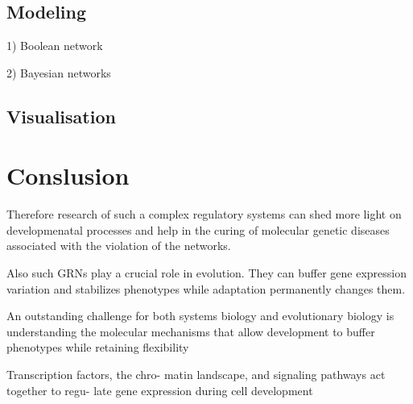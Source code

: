 \documentclass[a4paper, oneside]{report}
\begin{document}
\subsection*{Modeling}

1) Boolean network

2) Bayesian networks

\subsection*{Visualisation}

\section*{Conslusion}


Therefore research of such a complex regulatory systems can shed more light on developmenatal processes and help in the curing of molecular genetic diseases associated with the violation of the networks.

Also such GRNs play a crucial role in evolution.
They can buffer gene expression variation and stabilizes phenotypes while adaptation permanently changes them.

 An outstanding
challenge for both systems biology and evolutionary biology is
understanding the molecular mechanisms that allow development
to buffer phenotypes while retaining flexibility

Transcription factors, the chro-
matin landscape, and signaling
pathways act together to regu-
late gene expression during cell
development




\end{document}
